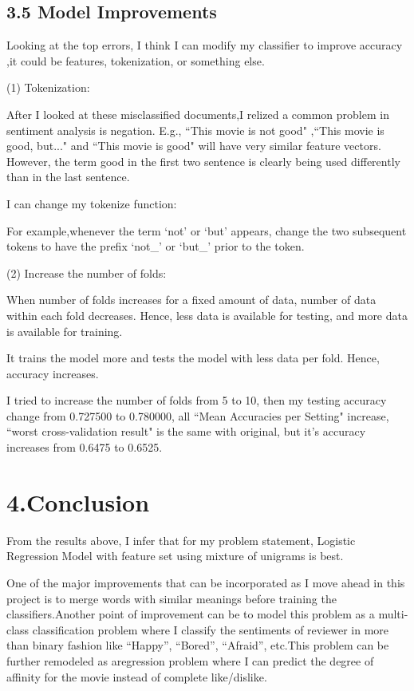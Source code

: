 \documentclass[11pt]{article}
\begin{document}
\subsection*{3.5 Model Improvements}
\hspace{1.5em}Looking at the top errors, I think I can modify my classifier to improve accuracy ,it could be features, tokenization, or something else.

(1) Tokenization:

After I looked at these misclassified documents,I relized a common problem in sentiment analysis is negation. E.g., ``This movie is not good" ,``This movie is good, but..." and ``This movie is good" will have very similar feature vectors. However, the term good in the first two sentence is clearly being used differently than in the last sentence. 

I can change my tokenize function:

For example,whenever the term `not' or `but' appears, change the two subsequent tokens to have the prefix `not\_' or `but\_' prior to the token.

(2) Increase the number of folds:

When number of folds increases for a fixed amount of data, number of data within each fold decreases. Hence, less data is available for testing, and more data is available for training. 

It trains the model more and tests the model with less data per fold. Hence, accuracy increases.

I tried to increase the number of folds from 5 to 10, then my testing accuracy change from 0.727500 to 0.780000, all ``Mean Accuracies per Setting" increase,
``worst cross-validation result" is the same with original, but it's accuracy increases from 0.6475 to 0.6525.


\section*{4.Conclusion}
\hspace{1.5em}From the results above, I infer that for my problem statement, Logistic Regression Model with feature set using mixture of unigrams is best.

One of the major improvements that can be incorporated as I move ahead in this project is to merge  words  with  similar  meanings  before  training  the  classifiers.Another  point  of improvement can be to model this problem as a multi-class classification problem where I classify the sentiments of reviewer in more than binary fashion like “Happy”, “Bored”, “Afraid”, etc.This problem can be further remodeled as aregression problem where I can predict the degree of affinity for the movie instead of complete like/dislike. 
\newpage
\end{document}
